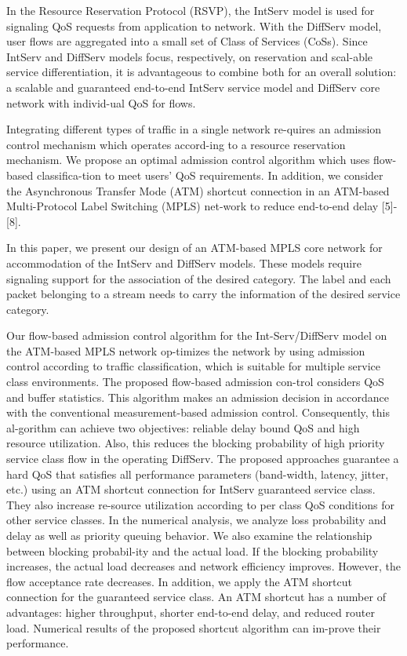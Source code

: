 \documentclass[10pt, twocolumn, twoside]{etri}
\begin{document}
In the Resource Reservation Protocol (RSVP), the IntServ model is
used for signaling QoS requests from application to network. With
the DiffServ model, user flows are aggregated into a small set of
Class of Services (CoSs). Since IntServ and DiffServ models focus,
respectively, on reservation and scal-able service differentiation, it
is advantageous to combine both for an overall solution: a scalable and
guaranteed end-to-end IntServ service model and DiffServ core network
with individ-ual QoS for flows.

Integrating different types of traffic in a single network re-quires
an admission control mechanism which operates accord-ing to a resource
reservation mechanism. We propose an optimal admission control algorithm
which uses flow-based classifica-tion to meet users' QoS requirements. In
addition, we consider the Asynchronous Transfer Mode (ATM) shortcut
connection in an ATM-based Multi-Protocol Label Switching (MPLS) net-work
to reduce end-to-end delay [5]-[8].

In this paper, we present our design of an ATM-based MPLS core network
for accommodation of the IntServ and DiffServ models. These models require
signaling support for the association of the desired category. The label
and each packet belonging to a stream needs to carry the information of
the desired service category.

Our flow-based admission control algorithm for the Int-Serv/DiffServ
model on the ATM-based MPLS network op-timizes the network by
using admission control according to traffic classification, which
is suitable for multiple service class environments. The proposed
flow-based admission con-trol considers QoS and buffer statistics. This
algorithm makes an admission decision in accordance with the conventional
measurement-based admission control. Consequently, this al-gorithm can
achieve two objectives: reliable delay bound QoS and high resource
utilization. Also, this reduces the blocking probability of high
priority service class flow in the operating DiffServ. The proposed
approaches guarantee a hard QoS that satisfies all performance parameters
(band-width, latency, jitter, etc.) using an ATM shortcut connection
for IntServ guaranteed service class. They also increase re-source
utilization according to per class QoS conditions for other service
classes. In the numerical analysis, we analyze loss probability and delay
as well as priority queuing behavior. We also examine the relationship
between blocking probabil-ity and the actual load. If the blocking
probability increases, the actual load decreases and network efficiency
improves. However, the flow acceptance rate decreases. In addition, we
apply the ATM shortcut connection for the guaranteed service class. An
ATM shortcut has a number of advantages: higher throughput, shorter
end-to-end delay, and reduced router load. Numerical results of the
proposed shortcut algorithm can im-prove their performance.
\end{document}
